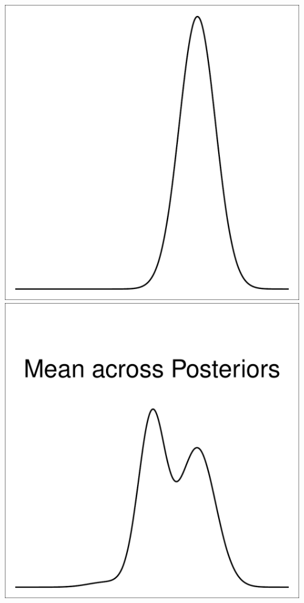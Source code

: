 \documentclass{beamer}
\begin{document}
\begin{frame}[t]
\begin{columns}[c]
\begin{flushright}
            \end{flushright}
            \begin{flushright}
                \includegraphics[width=1\textwidth]{bayesian_update_illustration_th3.pdf}\\
                \includegraphics[width=1\textwidth]{bayesian_update_illustration_posterior.pdf}\\
            \end{flushright}
    \end{columns}
\end{frame}
\end{document}
